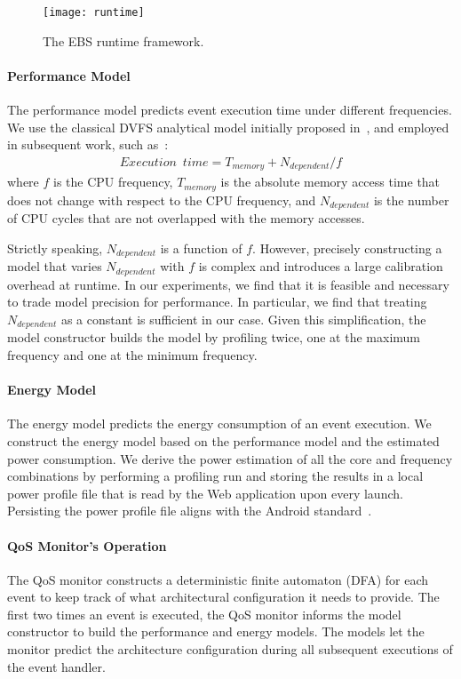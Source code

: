 \begin{figure}[t]
  \centering
  \texttt{[image: runtime]}
  \caption{\small{The EBS runtime framework.}}
  \label{fig:runtime}
\end{figure}

\paragraph{Performance Model} The performance model predicts event execution time under different frequencies. We use the classical DVFS analytical model initially proposed in~\cite{dvfs_model}, and employed in subsequent work, such as~\cite{dvfs_power}:
\begin{align*}
Execution\,\,\,time = T_{memory} + N_{dependent}/f
\end{align*}
where $f$ is the CPU frequency, $T_{memory}$ is the absolute memory access time that does not change with respect to the CPU frequency, and $N_{dependent}$ is the number of CPU cycles that are not overlapped with the memory accesses.

Strictly speaking, $N_{dependent}$ is a function of $f$. However, precisely constructing a model that varies $N_{dependent}$ with $f$ is complex and introduces a large calibration overhead at runtime. In our experiments, we find that it is feasible and necessary to trade model precision for performance. In particular, we find that treating $N_{dependent}$ as a constant is sufficient in our case. Given this simplification, the model constructor builds the model by profiling twice, one at the maximum frequency and one at the minimum frequency.

\paragraph{Energy Model} The energy model predicts the energy consumption of an event execution. We construct the energy model based on the performance model and the estimated power consumption. We derive the power estimation of all the core and frequency combinations by performing a profiling run and storing the results in a local power profile file that is read by the Web application upon every launch. Persisting the power profile file aligns with the Android standard~\cite{powerxml}. 

\paragraph{QoS Monitor's Operation} The QoS monitor constructs a deterministic finite automaton (DFA) for each event to keep track of what architectural configuration it needs to provide. The first two times an event is executed, the QoS monitor informs the model constructor to build the performance and energy models. The models let the monitor predict the architecture configuration during all subsequent executions of the event handler.

